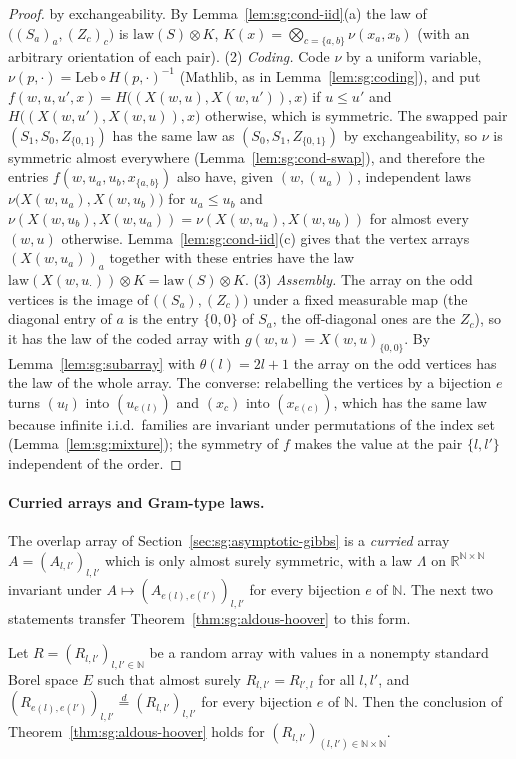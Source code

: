 \begin{proof}
by exchangeability. By Lemma~\ref{lem:sg:cond-iid}(a) the law of $\big((S_a)_a,(Z_c)_c\big)$ is $\mathrm{law}(S)\otimes K$, $K(x)=\bigotimes_{c=\{a,b\}}\nu(x_a,x_b)$ (with an arbitrary orientation of each pair).
(2) \emph{Coding.} Code $\nu$ by a uniform variable, $\nu(p,\cdot)=\mathrm{Leb}\circ H(p,\cdot)^{-1}$ (Mathlib, as in Lemma~\ref{lem:sg:coding}), and put $f(w,u,u',x)=H\big((X(w,u),X(w,u')),x\big)$ if $u\le u'$ and $H\big((X(w,u'),X(w,u)),x\big)$ otherwise, which is symmetric.
The swapped pair $(S_1,S_0,Z_{\{0,1\}})$ has the same law as $(S_0,S_1,Z_{\{0,1\}})$ by exchangeability, so $\nu$ is symmetric almost everywhere (Lemma~\ref{lem:sg:cond-swap}), and therefore the entries
$f(w,u_a,u_b,x_{\{a,b\}})$ also have, given $(w,(u_a))$, independent laws $\nu\big(X(w,u_a),X(w,u_b)\big)$ for $u_a\le u_b$ and $\nu(X(w,u_b),X(w,u_a))=\nu(X(w,u_a),X(w,u_b))$ for almost every $(w,u)$ otherwise.
Lemma~\ref{lem:sg:cond-iid}(c) gives that the vertex arrays $(X(w,u_a))_a$ together with these entries have the law $\mathrm{law}(X(w,u_\cdot))\otimes K=\mathrm{law}(S)\otimes K$.
(3) \emph{Assembly.} The array on the odd vertices is the image of $\big((S_a),(Z_c)\big)$ under a fixed measurable map (the diagonal entry of $a$ is the entry $\{0,0\}$ of $S_a$, the off-diagonal ones are the $Z_c$), so it has the law of the coded array with $g(w,u)=X(w,u)_{\{0,0\}}$.
By Lemma~\ref{lem:sg:subarray} with $\theta(l)=2l+1$ the array on the odd vertices has the law of the whole array.
The converse: relabelling the vertices by a bijection $e$ turns $(u_l)$ into $(u_{e(l)})$ and $(x_c)$ into $(x_{e(c)})$, which has the same law because infinite i.i.d.\ families are invariant under permutations of the index set (Lemma~\ref{lem:sg:mixture}); the symmetry of $f$ makes the value at the pair $\{l,l'\}$ independent of the order.
\end{proof}

\paragraph{Curried arrays and Gram-type laws.}
The overlap array of Section~\ref{sec:sg:asymptotic-gibbs} is a \emph{curried} array $A=(A_{l,l'})_{l,l'}$ which is only almost surely symmetric, with a law $\Lambda$ on $\mathbb R^{\mathbb N\times\mathbb N}$ invariant under $A\mapsto(A_{e(l),e(l')})_{l,l'}$ for every bijection $e$ of $\mathbb N$. The next two statements transfer Theorem~\ref{thm:sg:aldous-hoover} to this form.

\begin{theorem}\label{thm:sg:aldous-hoover-curried}
  \leanok
Let $R=(R_{l,l'})_{l,l'\in\mathbb N}$ be a random array with values in a nonempty standard Borel space $E$ such that almost surely $R_{l,l'}=R_{l',l}$ for all $l,l'$, and $(R_{e(l),e(l')})_{l,l'}\overset d=(R_{l,l'})_{l,l'}$ for every bijection $e$ of $\mathbb N$. Then the conclusion of Theorem~\ref{thm:sg:aldous-hoover} holds for $(R_{l,l'})_{(l,l')\in\mathbb N\times\mathbb N}$.
\end{theorem}

